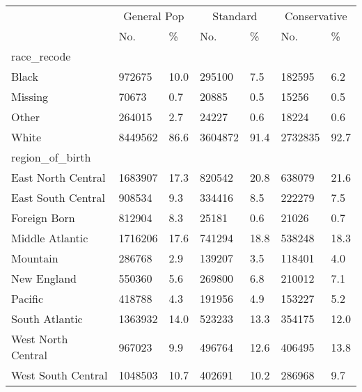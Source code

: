 \captionsetup[table]{labelformat=empty,skip=1pt}
\begin{longtable}{lllllll}
\toprule
 & \multicolumn{2}{c}{General Pop} & \multicolumn{2}{c}{Standard} & \multicolumn{2}{c}{Conservative} \\ 
 \cmidrule(lr){2-3} \cmidrule(lr){4-5} \cmidrule(lr){6-7}
 & No. & \% & No. & \% & No. & \% \\ 
\midrule
\multicolumn{1}{l}{race\_recode} \\ 
\midrule
Black & 972675 & 10.0 & 295100 & 7.5 & 182595 & 6.2 \\ 
Missing & 70673 & 0.7 & 20885 & 0.5 & 15256 & 0.5 \\ 
Other & 264015 & 2.7 & 24227 & 0.6 & 18224 & 0.6 \\ 
White & 8449562 & 86.6 & 3604872 & 91.4 & 2732835 & 92.7 \\ 
\midrule
\multicolumn{1}{l}{region\_of\_birth} \\ 
\midrule
East North Central & 1683907 & 17.3 & 820542 & 20.8 & 638079 & 21.6 \\ 
East South Central & 908534 & 9.3 & 334416 & 8.5 & 222279 & 7.5 \\ 
Foreign Born & 812904 & 8.3 & 25181 & 0.6 & 21026 & 0.7 \\ 
Middle Atlantic & 1716206 & 17.6 & 741294 & 18.8 & 538248 & 18.3 \\ 
Mountain & 286768 & 2.9 & 139207 & 3.5 & 118401 & 4.0 \\ 
New England & 550360 & 5.6 & 269800 & 6.8 & 210012 & 7.1 \\ 
Pacific & 418788 & 4.3 & 191956 & 4.9 & 153227 & 5.2 \\ 
South Atlantic & 1363932 & 14.0 & 523233 & 13.3 & 354175 & 12.0 \\ 
West North Central & 967023 & 9.9 & 496764 & 12.6 & 406495 & 13.8 \\ 
West South Central & 1048503 & 10.7 & 402691 & 10.2 & 286968 & 9.7 \\ 
 \bottomrule
\end{longtable}

